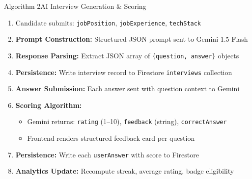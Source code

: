 \documentclass{beamer}
\begin{document}
\begin{frame}{Algorithm 2}{AI Interview Generation \& Scoring}
\begin{enumerate}
    \item Candidate submits: \texttt{jobPosition}, \texttt{jobExperience}, \texttt{techStack}

    \item \textbf{Prompt Construction:} Structured JSON prompt sent to Gemini 1.5 Flash

    \item \textbf{Response Parsing:} Extract JSON array of \texttt{\{question, answer\}} objects

    \item \textbf{Persistence:} Write interview record to Firestore \texttt{interviews} collection

    \item \textbf{Answer Submission:} Each answer sent with question context to Gemini

    \item \textbf{Scoring Algorithm:}
    \begin{itemize}
        \item Gemini returns: \texttt{rating} (1--10), \texttt{feedback} (string), \texttt{correctAnswer}
        \item Frontend renders structured feedback card per question
    \end{itemize}

    \item \textbf{Persistence:} Write each \texttt{userAnswer} with score to Firestore

    \item \textbf{Analytics Update:} Recompute streak, average rating, badge eligibility
\end{enumerate}
\end{frame}
\end{document}
